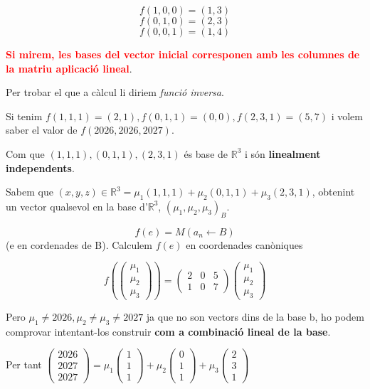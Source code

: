 \documentclass[12pt]{article}
\newcommand{\R}{\mathbb{R}}
\begin{document}
\[f(1,0,0) = (1,3)\]
\[f(0,1,0) = (2,3)\]
\[f(0,0,1) = (1,4)\]

\textcolor{red}{\textbf{Si mirem, les bases del vector inicial corresponen amb les columnes de la matriu aplicació lineal}}.

Per trobar el que a càlcul li diriem \textit{funció inversa}.

Si tenim $f(1,1,1) = (2,1), f(0,1,1) = (0,0), f(2,3,1) = (5,7)$ i volem saber el valor de $f(2026,2026,2027)$. 

Com que $(1,1,1), (0,1,1), (2,3,1)$ és base de $\R^3$ i són \textbf{linealment independents}.

Sabem que $(x,y,z) \in \R^3 = \mu_1 (1,1,1) + \mu_2(0,1,1) + \mu_3 (2,3,1)$, obtenint un vector qualsevol en la base d'$\R^3$, $(\mu_1, \mu_2, \mu_3)_B$.

\[f(e) = M(a_n \leftarrow B)\] (e en cordenades de B). Calculem $f(e)$ en coordenades canòniques

\[f(\begin{pmatrix}
    \mu_1 \\
    \mu_2 \\
    \mu_3
\end{pmatrix}) = \begin{pmatrix}
    2 & 0 & 5\\
    1 & 0 & 7
\end{pmatrix} \begin{pmatrix}
    \mu_1 \\
    \mu_2 \\
    \mu_3
\end{pmatrix}\]

Pero $\mu_1 \neq 2026, \mu_2 \neq \mu_3 \neq 2027$ ja que no son vectors dins de la base b, ho podem comprovar intentant-los construir \textbf{com a combinació lineal de la base}.

Per tant $\begin{pmatrix}
    2026 \\
    2027\\
    2027
\end{pmatrix} = \mu_1 \begin{pmatrix}
    1\\
    1\\
    1
\end{pmatrix} + \mu_2 \begin{pmatrix}
    0\\
    1\\
    1
\end{pmatrix} + \mu_3 \begin{pmatrix}
    2\\
    3\\
    1
\end{pmatrix}$
\end{document}
